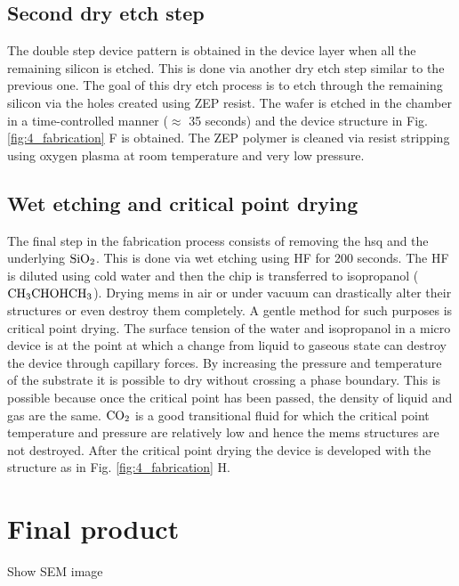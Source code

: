 \documentclass[../report.tex]{subfiles}
\begin{document}
\subsection{Second dry etch step}
The double step device pattern is obtained in the device layer when all the remaining silicon is etched. This is done via another dry etch step similar to the previous one. The goal of this dry etch process is to etch through the remaining silicon via the holes created using ZEP resist. The wafer is etched in the chamber in a time-controlled manner ($\approx$ 35 seconds) and the device structure in Fig. \ref{fig:4_fabrication} F is obtained. The ZEP polymer is cleaned via resist stripping using oxygen plasma at room temperature and very low pressure. 

\subsection{Wet etching and critical point drying}
The final step in the fabrication process consists of removing the \gls{hsq} and the underlying $\mathrm{SiO_2}$. This is done via wet etching using HF for 200 seconds. The HF is diluted using cold water and then the chip is transferred to isopropanol ($\mathrm{CH_3CHOHCH_3}$). Drying \gls{mems} in air or under vacuum can drastically alter their structures or even destroy them completely. A gentle method for such purposes is critical point drying. The surface tension of the water and isopropanol in a micro device is at the point at which a change from liquid to gaseous state can destroy the device through capillary forces. By increasing the pressure and temperature of the substrate it is possible to dry without crossing a phase boundary. This is possible because once the critical point has been passed, the density of liquid and gas are the same. $\mathrm{CO_2}$ is a good transitional fluid for which the critical point temperature and pressure are relatively low and hence the \gls{mems} structures are not destroyed. After the critical point drying the device is developed with the structure as in Fig. \ref{fig:4_fabrication} H. 

\section{Final product}

Show SEM image
\end{document}
